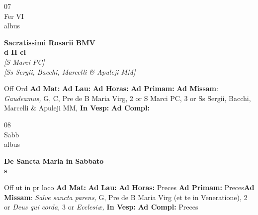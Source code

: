 \documentclass[10pt, openany]{book}
\begin{document}
    \begin{center}
        \begin{minipage}{3.5in}
            \vspace{2em}
            \begin{minipage}{0.5in}
                {\Huge 07} \\
                {\normalsize Fer VI} \\
                {\normalsize albus}
            \end{minipage}
            \begin{minipage}{3.0in}
                \textbf{ \large Sacratissimi Rosarii BMV \\
                \textnormal{\normalsize d II cl}} \\ \textit{[S Marci PC]} \\ \textit{[Ss Sergii, Bacchi, Marcelli \& Apuleji MM]} \\ 
            \end{minipage}
            \begin{justify}Off Ord
                \textbf{Ad Mat: }
                \textbf{Ad Lau: }
                \textbf{Ad Horas: }
                \textbf{Ad Primam: }\textbf{Ad Missam}: \textit{Gaudeamus,} G, C, Pre de B Maria Virg, 2 or S Marci PC, 3 or Ss Sergii, Bacchi, Marcelli \& Apuleji MM,  
                \textbf{In Vesp: }
                \textbf{Ad Compl: }
            \end{justify}
        \end{minipage}
    \end{center}

    \begin{center}
        \begin{minipage}{3.5in}
            \vspace{2em}
            \begin{minipage}{0.5in}
                {\Huge 08} \\
                {\normalsize Sabb} \\
                {\normalsize albus}
            \end{minipage}
            \begin{minipage}{3.0in}
                \textbf{ \large De Sancta Maria in Sabbato \\
                \textnormal{\normalsize s}} \\ 
            \end{minipage}
            \begin{justify}Off ut in pr loco
                \textbf{Ad Mat: }
                \textbf{Ad Lau: }
                \textbf{Ad Horas: }Preces
                \textbf{Ad Primam: }Preces\textbf{Ad Missam}: \textit{Salve sancta parens,} G, Pre de B Maria Virg (et te in Veneratione), 2 or \textit{Deus qui corda,} 3 or \textit{Ecclesiæ,}  
                \textbf{In Vesp: }
                \textbf{Ad Compl: }Preces
            \end{justify}
        \end{minipage}
    \end{center}
\end{document}
